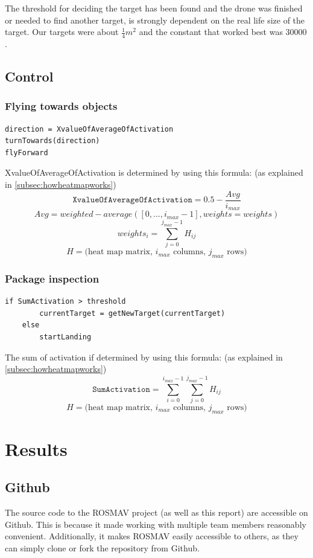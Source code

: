 \documentclass[a4paper,10pt]{article}
\begin{document}
The threshold for deciding the target has been found and the drone was
finished or needed to find another target, is strongly dependent on the
real life size of the target. Our targets were about $\frac{1}{4} m^2$
and the constant that worked best was $30 000$.


\subsection{Control}

\subsubsection{Flying towards objects\label{flytowards}}
\begin{verbatim}
direction = XvalueOfAverageOfActivation
turnTowards(direction)
flyForward
\end{verbatim}
XvalueOfAverageOfActivation is determined by using this formula: (as explained in \ref{subsec:howheatmapworks})
\[\texttt{XvalueOfAverageOfActivation} = 0.5 - \frac{Avg}{i_{max}}\]
\[Avg = weighted-average([0, ..., i_{max} - 1], weights=weights)\]
\[weights_i = \sum_{j=0}^{j_{max}-1} H_{ij} \]
\[H = \textrm{(heat map matrix, $i_{max}$ columns, $j_{max}$ rows)}\]

\subsubsection{Package inspection\label{sec:packageinspection}}
\begin{verbatim}
if SumActivation > threshold
        currentTarget = getNewTarget(currentTarget)
    else
        startLanding
\end{verbatim}
The sum of activation if determined by using this formula: (as explained in \ref{subsec:howheatmapworks})
\[\texttt{SumActivation} = \sum_{i=0}^{i_{max}-1} \sum_{j=0}^{j_{max}-1} H_{ij}\]
\[H = \textrm{(heat map matrix, $i_{max}$ columns, $j_{max}$ rows)}\]

\section{Results}

\subsection{Github}
The source code to the ROSMAV project (as well as this report) are accessible
on Github. This is because it made working with multiple team members
reasonably convenient. Additionally, it makes ROSMAV easily accessible to
others, as they can simply clone or fork the repository from Github.
\end{document}
